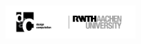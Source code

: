 \documentclass[
	a4paper, %
	11pt, %
]{DC_Report}
\begin{document}

\thispagestyle{empty} %

\begin{fullwidth} %
	\vspace*{-0.075\textheight} %
	
	\hfill\includegraphics[width=5cm]{Images/logo_dc_cut_curves.pdf} %

	\vspace{0.15\textheight} %

	\parbox{0.9\fulltextwidth}{\fontsize{50pt}{52pt}\selectfont\raggedright\textbf{\reporttitle}\par} %
	
	\vspace{0.03\textheight} %
	
	{\LARGE\textit{\textbf{\reportsubtitle}}\par} %
	
	\vfill %
	
	{\Large\reportauthors\par} %
	
	\vfill\vfill\vfill %
	
	{\large\reportdate\par} %
\end{fullwidth}

\newpage


\thispagestyle{empty} %
\end{document}

